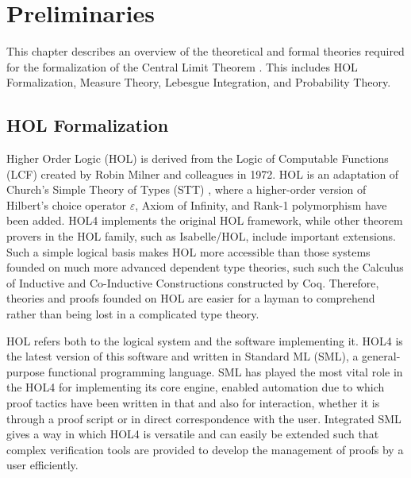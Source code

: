 \chapter[Preliminaries]{Preliminaries}
\label{chap:3}

This chapter describes an overview of the theoretical and formal theories required for the formalization of the Central Limit Theorem . This includes HOL Formalization, Measure Theory, Lebesgue Integration, and Probability Theory.
\section{HOL Formalization}
Higher Order Logic (HOL) \cite{hol4, slind2008brief} is derived from the Logic of Computable Functions (LCF) \cite{gordon1979edinburgh, milner1972logic} created by Robin Milner and colleagues in 1972. HOL is an adaptation of Church's Simple Theory of Types (STT) \cite{church1940formulation}, where a higher-order version of Hilbert's choice operator \(\varepsilon \), Axiom of Infinity, and Rank-1 polymorphism have been added. HOL4 implements the original HOL framework, while other theorem provers in the HOL family, such as Isabelle/HOL, include important extensions. Such a simple logical basis makes HOL more accessible than those systems founded on much more advanced dependent type theories, such such the Calculus of Inductive and Co-Inductive Constructions constructed by Coq. Therefore, theories and proofs founded on HOL are easier for a layman to comprehend rather than being lost in a complicated type theory.

HOL refers both to the logical system and the software implementing it. HOL4 is the latest version of this software and written in Standard ML (SML), a general-purpose functional programming language.  SML has played the most vital role in the HOL4 for implementing its core engine, enabled automation due to which proof tactics have been written in that and also for interaction, whether it is through a proof script or in direct correspondence with the user. Integrated SML gives a way in which HOL4 is versatile and can easily be extended such that complex verification tools are provided to develop the management of proofs by a user efficiently.

